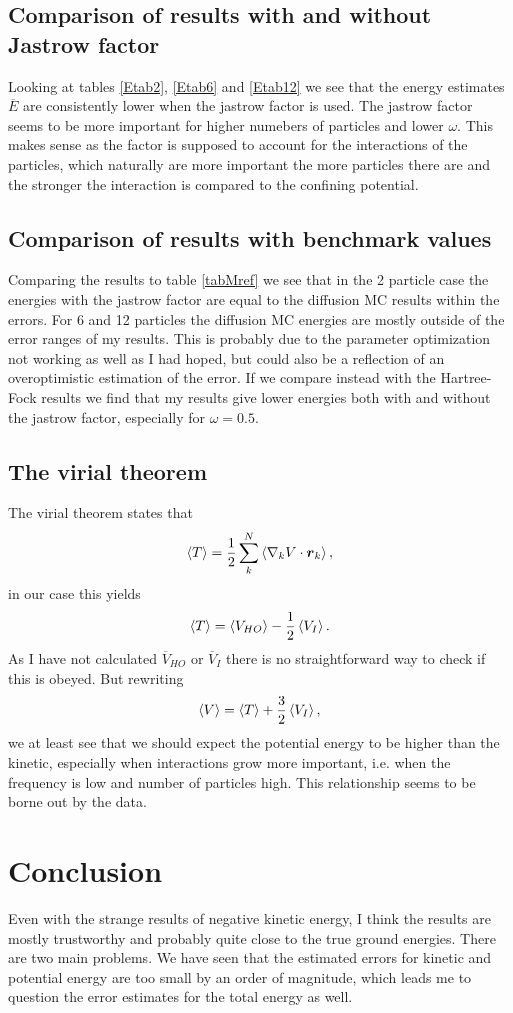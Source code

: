\documentclass[a4paper,English,10pt]{article}
\newcommand{\bb}[1]{\boldsymbol{#1}}
\newcommand{\be}{\begin{equation}}
\newcommand{\ee}{\end{equation}}
\newcommand{\f}{\frac}
\renewcommand{\bar}{\overline}
\renewcommand{\braket}{\Braket}
\begin{document}
\subsection{Comparison of results with and without Jastrow factor}
Looking at tables \ref{Etab2}, \ref{Etab6} and \ref{Etab12} we see that the energy estimates $\bar{E}$ are consistently lower when the jastrow factor is used.
The jastrow factor seems to be more important for higher numebers of particles and lower $\omega$. This makes sense as the factor is supposed to account for the interactions
of the particles, which naturally are more important the more particles there are and the stronger the interaction is compared to the confining potential.

\subsection{Comparison of results with benchmark values}
Comparing the results to table \ref{tabMref} we see that in the 2 particle case the energies with the jastrow factor are equal to the diffusion MC results within the errors.
For 6 and 12 particles the diffusion MC energies are mostly outside of the error ranges of my results. This is probably due to the parameter optimization not working as well
as I had hoped, but could also be a reflection of an overoptimistic estimation of the error. If we compare instead with the Hartree-Fock results we find that my results
give lower energies both with and without the jastrow factor, especially for $\omega = 0.5$.

\subsection{The virial theorem}
The virial theorem states that
\be
\braket{T} = \frac{1}{2}\sum_k^N\braket{\nabla_k V \cdot \bb{r}_k},
\ee
in our case this yields
\be
\braket{T} = \braket{V_{HO}} - \frac{1}{2} \braket{V_I}.
\ee
As I have not calculated $\bar{V}_{HO}$ or $\bar{V}_I$ there is no straightforward way to check if this is obeyed.
But rewriting
\be
\braket{V} = \braket{T} + \f{3}{2}\braket{V_I},
\ee
we at least see that we should expect the potential energy to be higher than the kinetic, especially when interactions grow more important, i.e. when
the frequency is low and number of particles high. This relationship seems to be borne out by the data.

\section{Conclusion}
Even with the strange results of negative kinetic energy, I think the results are mostly trustworthy and probably quite close to the true ground energies.
There are two main problems. We have seen that the estimated errors for kinetic and potential energy are too small by an order of magnitude, which leads me to
question the error estimates for the total energy as well.
\end{document}
